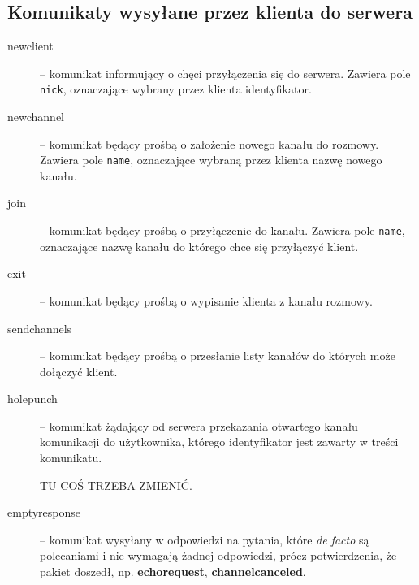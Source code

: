\documentclass[a4paper, 10pt]{article}
\begin{document}
\subsection{Komunikaty wysyłane przez klienta do serwera}
\begin{description}
 \item[newclient] -- komunikat informujący o chęci przyłączenia się do serwera. Zawiera pole \texttt{nick}, oznaczające wybrany przez klienta identyfikator.
 \item[newchannel] -- komunikat będący prośbą o założenie nowego kanału do rozmowy. Zawiera pole \texttt{name}, oznaczające wybraną przez klienta nazwę nowego kanału.
 \item[join] -- komunikat będący prośbą o przyłączenie do kanału. Zawiera pole \texttt{name}, oznaczające nazwę kanału do którego chce się przyłączyć klient.
 \item[exit] -- komunikat będący prośbą o wypisanie klienta z kanału rozmowy.
 \item[sendchannels] -- komunikat będący prośbą o przesłanie listy kanałów do których może dołączyć klient.
 \item[holepunch] -- komunikat żądający od serwera przekazania otwartego kanału komunikacji do użytkownika, którego identyfikator jest zawarty w treści komunikatu. \begin{large}TU COŚ TRZEBA ZMIENIĆ. \end{large}
 \item[emptyresponse] -- komunikat wysyłany w odpowiedzi na pytania, które \textit{de facto} są polecaniami i nie wymagają żadnej odpowiedzi, prócz potwierdzenia, że pakiet doszedł, np. \textbf{echorequest}, \textbf{channelcanceled}.
\end{description}
\end{document}
